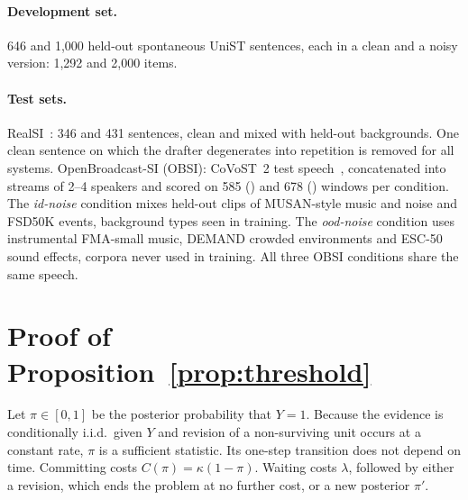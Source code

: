\paragraph{Development set.}
646 \enzh{} and 1{,}000 \zhen{} held-out spontaneous UniST sentences, each in a clean and a noisy version: 1{,}292 and 2{,}000 items.

\paragraph{Test sets.}
RealSI~\citep{cheng2024realsi}: 346 \enzh{} and 431 \zhen{} sentences, clean and mixed with held-out backgrounds.
One \enzh{} clean sentence on which the drafter degenerates into repetition is removed for all systems.
OpenBroadcast-SI (OBSI): CoVoST~2 test speech~\citep{wang2020covost2}, concatenated into streams of 2--4 speakers and scored on 585 (\enzh{}) and 678 (\zhen{}) windows per condition.
The \emph{id-noise} condition mixes held-out clips of MUSAN-style music and noise and FSD50K events, background types seen in training.
The \emph{ood-noise} condition uses instrumental FMA-small music, DEMAND crowded environments and ESC-50 sound effects, corpora never used in training.
All three OBSI conditions share the same speech.

\section{Proof of Proposition~\ref{prop:threshold}}
\label{app:proof}

Let $\pi \in [0,1]$ be the posterior probability that $Y = 1$.
Because the evidence is conditionally i.i.d.\ given $Y$ and revision of a non-surviving unit occurs at a constant rate, $\pi$ is a sufficient statistic.
Its one-step transition does not depend on time.
Committing costs $C(\pi) = \kappa(1 - \pi)$.
Waiting costs $\lambda$, followed by either a revision, which ends the problem at no further cost, or a new posterior $\pi'$.

